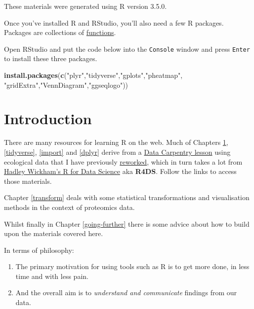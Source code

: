 \documentclass[12pt,]{book}
\newenvironment{Shaded}{\begin{snugshade}}{\end{snugshade}}
\newcommand{\KeywordTok}[1]{\textcolor[rgb]{0.13,0.29,0.53}{\textbf{#1}}}
\newcommand{\NormalTok}[1]{#1}
\newcommand{\StringTok}[1]{\textcolor[rgb]{0.31,0.60,0.02}{#1}}
\begin{document}
These materials were generated using R version 3.5.0.

Once you've installed R and RStudio, you'll also need
a few R packages. Packages are collections of \protect\hyperlink{function-anatomy}{functions}.

Open RStudio and put the code below into the \texttt{Console}
window and press \texttt{Enter} to install these three packages.

\begin{Shaded}
\begin{Highlighting}[]
\KeywordTok{install.packages}\NormalTok{(}\KeywordTok{c}\NormalTok{(}\StringTok{"plyr"}\NormalTok{,}\StringTok{"tidyverse"}\NormalTok{,}\StringTok{"gplots"}\NormalTok{,}\StringTok{"pheatmap"}\NormalTok{,}
                   \StringTok{"gridExtra"}\NormalTok{,}\StringTok{"VennDiagram"}\NormalTok{,}\StringTok{"ggseqlogo"}\NormalTok{))}
\end{Highlighting}
\end{Shaded}

\hypertarget{intro}{%
\chapter{Introduction}\label{intro}}

There are many resources for learning R on the web. Much of Chapters \ref{intro},
\ref{tidyverse}, \ref{import} and \ref{dplyr} derive from
a \href{http://www.datacarpentry.org/lessons/}{Data Carpentry lesson} using
ecological data that I have previously \href{https://southampton-rsg.github.io/2017-08-01-southampton-dc/novice/R-ecology-lesson/index.html}{reworked},
which in turn takes a lot from \href{http://r4ds.had.co.nz/}{Hadley Wickham's R for Data Science} aka \textbf{R4DS}.
Follow the links to access those materials.

Chapter \ref{transform} deals with some statistical transformations and
visualisation methods in the context of proteomics data.

Whilst finally in
Chapter \ref{going-further} there is some advice about how to build upon the
materials covered here.

In terms of philosophy:

\begin{enumerate}
\def\labelenumi{\arabic{enumi}.}
\item
  The primary motivation for using tools such as R is to get more done, in
  less time and with less pain.
\item
  And the overall aim is to \emph{understand and communicate} findings from our
  data.
\end{enumerate}
\end{document}
